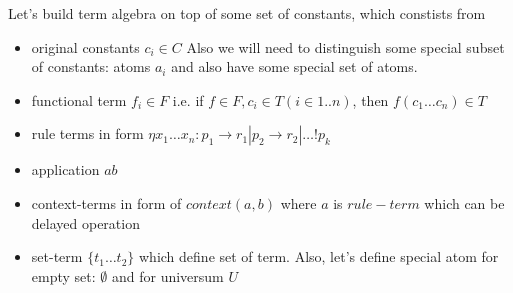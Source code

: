 \documentclass[12pt]{article}
\begin{document}
   Let's build term algebra on top of some set of constants, which constists from
\begin{itemize}
 \item original constants ${c_i} \in C$ Also we
 will need to distinguish some special subset of constants: atoms ${a_i}$ and also have some special set 
of atoms.
 \item functional term $f_i \in F$  i.e. if $f \in F, c_i \in T (i \in 1..n)$, then $f(c_{1} \dots c_{n}) \in T$
 \item rule terms in form $\eta x_1 \dots x_n : p_{1} \to r_1 | p_2 \to r_2 | \dots ! p_{k}$
 \item application $a b$
 \item context-terms in form of $context(a,b)$ where $a$ is $rule-term$ which can be  delayed operation
 \item set-term $\{ t_1 \dots t_2 \}$ which define set of term. Also, let's define special atom for empty
  set: $\emptyset$ and for universum $U$
\end{itemize}
\end{document}
